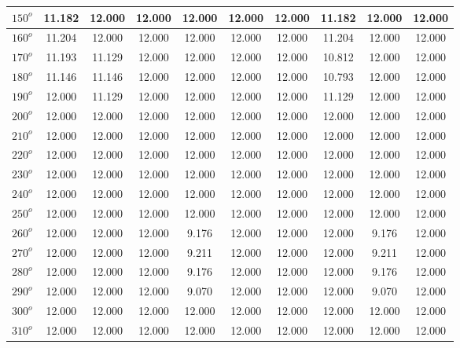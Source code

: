 \begin{table}[H]
\begin{tabular}{|c|c|c|c|c|c|c|c|c|c|}
	         \hline
	         $150^{o}$ & 11.182 & 12.000 & 12.000 & 12.000 & 12.000 & 12.000 & 11.182 & 12.000 & 12.000\\
	         \hline
	         $160^{o}$ & 11.204 & 12.000 & 12.000 & 12.000 & 12.000 & 12.000 & 11.204 & 12.000 & 12.000  \\
	         \hline
	         $170^{o}$ & 11.193 & 11.129 & 12.000 & 12.000 & 12.000 & 12.000 & 10.812 & 12.000 & 12.000  \\
	         \hline
	         $180^{o}$ & 11.146 & 11.146 & 12.000 & 12.000 & 12.000 & 12.000 & 10.793 & 12.000 & 12.000  \\
	         \hline
	         $190^{o}$ & 12.000 & 11.129 & 12.000 & 12.000 & 12.000 & 12.000 & 11.129 & 12.000 & 12.000  \\
	         \hline
	         $200^{o}$ & 12.000 & 12.000 & 12.000 & 12.000 & 12.000 & 12.000 & 12.000& 12.000 & 12.000  \\
	         \hline
	         $210^{o}$ & 12.000 & 12.000 & 12.000 & 12.000 & 12.000 & 12.000 & 12.000& 12.000 & 12.000  \\
	         \hline
	         $220^{o}$ & 12.000 & 12.000 & 12.000 & 12.000 & 12.000 & 12.000 & 12.000& 12.000 & 12.000  \\
	         \hline
	         $230^{o}$ & 12.000 & 12.000 & 12.000 & 12.000 & 12.000 & 12.000 & 12.000& 12.000 & 12.000  \\
	         \hline
	         $240^{o}$ & 12.000 & 12.000 & 12.000 & 12.000 & 12.000 & 12.000 & 12.000& 12.000 & 12.000  \\
	         \hline
	         $250^{o}$ & 12.000 & 12.000 & 12.000 & 12.000 & 12.000 & 12.000 & 12.000& 12.000 & 12.000  \\
	         \hline
	         $260^{o}$ & 12.000 & 12.000 & 12.000 & 9.176 & 12.000 & 12.000 & 12.000& 9.176 & 12.000  \\
	         \hline
	         $270^{o}$ & 12.000 & 12.000 & 12.000 & 9.211 & 12.000 & 12.000 & 12.000& 9.211 & 12.000  \\
	         \hline
	         $280^{o}$ & 12.000 & 12.000 & 12.000 & 9.176 & 12.000 & 12.000 & 12.000 & 9.176 & 12.000  \\
	         \hline
	         $290^{o}$ & 12.000 & 12.000 & 12.000 & 9.070 & 12.000 & 12.000 & 12.000& 9.070 & 12.000  \\
	         \hline
	         $300^{o}$ & 12.000 & 12.000 & 12.000 & 12.000 & 12.000 & 12.000 & 12.000& 12.000 & 12.000  \\
	         \hline
	         $310^{o}$ & 12.000 & 12.000 & 12.000 & 12.000 & 12.000 & 12.000 & 12.000& 12.000 & 12.000  \\

\end{tabular}
\end{table}

